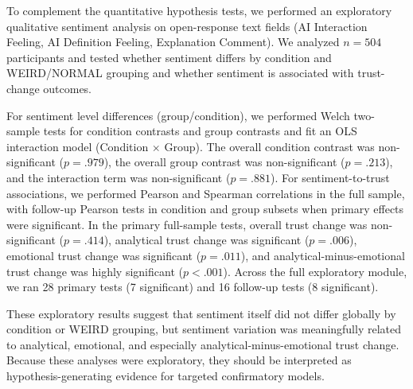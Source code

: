 To complement the quantitative hypothesis tests, we performed an exploratory qualitative sentiment analysis on open-response text fields (AI Interaction Feeling, AI Definition Feeling, Explanation Comment). We analyzed $n=504$ participants and tested whether sentiment differs by condition and WEIRD/NORMAL grouping and whether sentiment is associated with trust-change outcomes.

For sentiment level differences (group/condition), we performed Welch two-sample tests for condition contrasts and group contrasts and fit an OLS interaction model (Condition $\times$ Group). The overall condition contrast was non-significant ($p = .979$), the overall group contrast was non-significant ($p = .213$), and the interaction term was non-significant ($p = .881$). For sentiment-to-trust associations, we performed Pearson and Spearman correlations in the full sample, with follow-up Pearson tests in condition and group subsets when primary effects were significant. In the primary full-sample tests, overall trust change was non-significant ($p = .414$), analytical trust change was significant ($p = .006$), emotional trust change was significant ($p = .011$), and analytical-minus-emotional trust change was highly significant ($p < .001$). Across the full exploratory module, we ran 28 primary tests (7 significant) and 16 follow-up tests (8 significant).

These exploratory results suggest that sentiment itself did not differ globally by condition or WEIRD grouping, but sentiment variation was meaningfully related to analytical, emotional, and especially analytical-minus-emotional trust change. Because these analyses were exploratory, they should be interpreted as hypothesis-generating evidence for targeted confirmatory models.